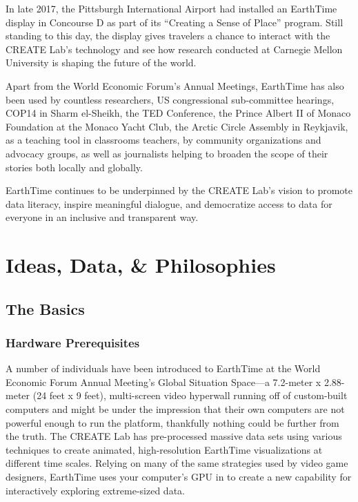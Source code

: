 \documentclass[
]{krantz}
\begin{document}
In late 2017, the Pittsburgh International Airport had installed an EarthTime display in Concourse D as part of its ``Creating a Sense of Place'' program. Still standing to this day, the display gives travelers a chance to interact with the CREATE Lab's technology and see how research conducted at Carnegie Mellon University is shaping the future of the world.

Apart from the World Economic Forum's Annual Meetings, EarthTime has also been used by countless researchers, US congressional sub-committee hearings, COP14 in Sharm el-Sheikh, the TED Conference, the Prince Albert II of Monaco Foundation at the Monaco Yacht Club, the Arctic Circle Assembly in Reykjavik, as a teaching tool in classrooms teachers, by community organizations and advocacy groups, as well as journalists helping to broaden the scope of their stories both locally and globally.

EarthTime continues to be underpinned by the CREATE Lab's vision to promote data literacy, inspire meaningful dialogue, and democratize access to data for everyone in an inclusive and transparent way.

\hypertarget{part-ideas-data-philosophies}{%
\part{Ideas, Data, \& Philosophies}\label{part-ideas-data-philosophies}}

\hypertarget{the-basics}{%
\chapter{The Basics}\label{the-basics}}

\hypertarget{hardware-prerequisites}{%
\section{Hardware Prerequisites}\label{hardware-prerequisites}}

A number of individuals have been introduced to EarthTime at the World Economic Forum Annual Meeting's Global Situation Space---a 7.2-meter x 2.88-meter (24 feet x 9 feet), multi-screen video hyperwall running off of custom-built computers and might be under the impression that their own computers are not powerful enough to run the platform, thankfully nothing could be further from the truth. The CREATE Lab has pre-processed massive data sets using various techniques to create animated, high-resolution EarthTime visualizations at different time scales. Relying on many of the same strategies used by video game designers, EarthTime uses your computer's GPU in to create a new capability for interactively exploring extreme-sized data.
\end{document}
